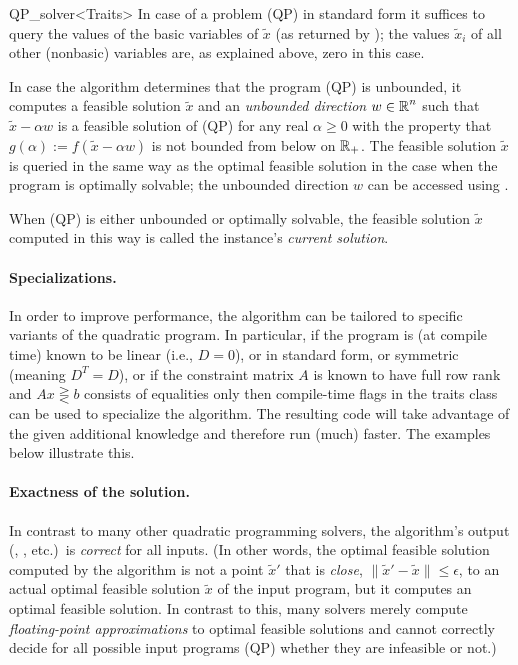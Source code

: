 \begin{ccRefClass}{QP_solver<Traits>}
In case of a problem (QP) in standard form it suffices to query the
values of the basic variables of $\tilde{x}$ (as returned by
); the values
$\tilde{x}_i$ of all other (nonbasic) variables are, as explained
above, zero in this case.

In case the algorithm determines that the program (QP) is unbounded,
it computes a feasible solution $\tilde{x}$ and an \emph{unbounded
direction} $w\in\mbox{$\mathbb R$}^n$ such that $\tilde{x}-\alpha w$ is a feasible
solution of (QP) for any real $\alpha\geq 0$ with the property that
$g(\alpha):= f(\tilde{x}-\alpha w)$ is not bounded from below on
$\mbox{$\mathbb R$}_+$.  The feasible solution $\tilde{x}$ is queried in the same way
as the optimal feasible solution in the case when the program is
optimally solvable; the unbounded direction $w$ can be accessed using
.

When (QP) is either unbounded or optimally solvable, the feasible
solution $\tilde{x}$ computed in this way is called the instance's
\emph{current solution}.

\paragraph{Specializations.}
In order to improve performance, the algorithm can be tailored to
specific variants of the quadratic program.  In particular, if the
program is (at compile time) known to be linear (i.e., $D=0$), or in
standard form, or symmetric (meaning $D^{T}=D$), or if the constraint
matrix $A$ is known to have full row rank and $Ax \gtreqless b$
consists of equalities only then compile-time flags in the traits
class  can be used to specialize the algorithm.  The
resulting code will take advantage of the given additional knowledge
and therefore run (much) faster. The examples below illustrate this.

\paragraph{Exactness of the solution.}
In contrast to many other quadratic programming solvers, the
algorithm's output (, , etc.)\ is
\emph{correct} for all inputs.  (In other words, the optimal feasible
solution computed by the algorithm is not a point $\tilde{x}'$ that is
\emph{close}, $\|\tilde{x}'-\tilde{x}\|\le \epsilon$, to an actual
optimal feasible solution $\tilde{x}$ of the input program, but it
computes an optimal feasible solution.  In contrast to this, many
solvers merely compute \emph{floating-point approximations} to optimal
feasible solutions and cannot correctly decide for all possible input
programs (QP) whether they are infeasible or not.)


\end{ccRefClass}
